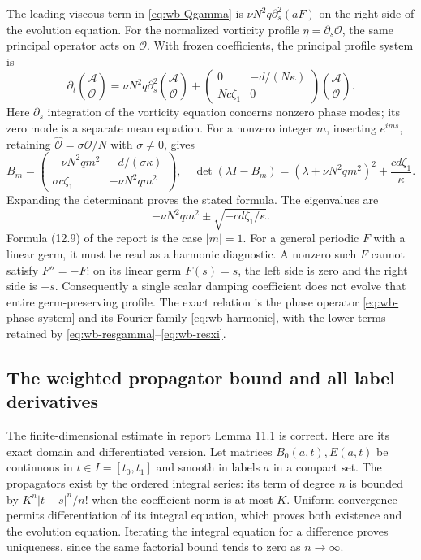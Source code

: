 The leading viscous term in \eqref{eq:wb-Qgamma} is
$\nu N^2q\partial_s^2(aF)$ on the right side of the evolution equation.
For the normalized vorticity profile $\eta=\partial_s\mathcal O$,
the same principal operator acts on $\mathcal O$. With frozen
coefficients, the principal profile system is
\begin{equation}
 \partial_t\binom{\mathcal A}{\mathcal O}
 =\nu N^2q\partial_s^2\binom{\mathcal A}{\mathcal O}
 +\begin{pmatrix}0&-d/(N\kappa)\\Nc\zeta_1&0\end{pmatrix}
 \binom{\mathcal A}{\mathcal O}.
 \label{eq:wb-phase-system}
\end{equation}
Here $\partial_s$ integration of the vorticity equation concerns nonzero
phase modes; its zero mode is a separate mean equation. For a nonzero
integer $m$, inserting $e^{ims}$, retaining
$\widehat{\mathcal O}=\sigma\mathcal O/N$ with $\sigma\ne0$, gives
\begin{equation}
 B_m=\begin{pmatrix}
 -\nu N^2qm^2&-d/(\sigma\kappa)\\
 \sigma c\zeta_1&-\nu N^2qm^2
 \end{pmatrix},\quad
 \det(\lambda I-B_m)=(\lambda+\nu N^2qm^2)^2+\frac{cd\zeta_1}{\kappa}.
 \label{eq:wb-harmonic}
\end{equation}
Expanding the determinant proves the stated formula. The eigenvalues are
\[
 -\nu N^2qm^2\pm\sqrt{-cd\zeta_1/\kappa}.
\]
Formula (12.9) of the
report is the case $|m|=1$. For a general periodic $F$ with a linear
germ, it must be read as a harmonic diagnostic. A nonzero such $F$
cannot satisfy $F''=-F$: on its linear germ $F(s)=s$, the left side
is zero and the right side is $-s$. Consequently a single scalar
damping coefficient does not evolve that entire germ-preserving profile.
The exact relation is the phase operator \eqref{eq:wb-phase-system}
and its Fourier family \eqref{eq:wb-harmonic}, with the lower terms
retained by \eqref{eq:wb-resgamma}--\eqref{eq:wb-resxi}.

\subsection{The weighted propagator bound and all label derivatives}

The finite-dimensional estimate in report Lemma 11.1 is correct.
Here are its exact domain and differentiated version. Let matrices
$B_0(a,t),E(a,t)$ be continuous in $t\in I=[t_0,t_1]$ and smooth
in labels $a$ in a compact set. The propagators exist by the ordered
integral series: its term of degree $n$ is bounded by
$K^n|t-s|^n/n!$ when the coefficient norm is at most $K$.
Uniform convergence permits differentiation of its integral equation,
which proves both existence and the evolution equation. Iterating the
integral equation for a difference proves uniqueness, since the same
factorial bound tends to zero as $n\to\infty$.

